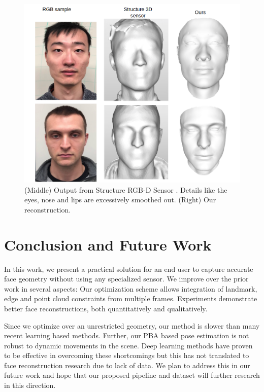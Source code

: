 \documentclass[10pt,twocolumn,letterpaper]{article}
\begin{document}
\begin{figure}
\begin{center}
   \includegraphics[width=0.6\linewidth]{images/struc_3d_comp.png}
\end{center}
   \caption{(Middle) Output from Structure RGB-D Sensor \cite{structure2019}. Details like the eyes, nose and lips are excessively smoothed out. (Right) Our reconstruction.}
\label{fig:long}
\label{fig:onecol}
\end{figure}



\section{Conclusion and Future Work}
In this work, we present a practical solution for an end user to capture accurate face geometry without using any specialized sensor. We improve over the prior work in several aspects: Our optimization scheme allows integration of landmark, edge and point cloud constraints from multiple frames. Experiments demonstrate better face reconstructions, both quantitatively and qualitatively. 

Since we optimize over an unrestricted geometry, our method is slower than many recent learning based methods. Further, our PBA based pose estimation is not robust to dynamic movements in the scene. Deep learning methods have proven to be effective in overcoming these shortcomings but this has not translated to face reconstruction research due to lack of data. We plan to address this in our future work and hope that our proposed pipeline and dataset will further research in this direction.    

\newpage
\newpage
{\small


}
\end{document}
